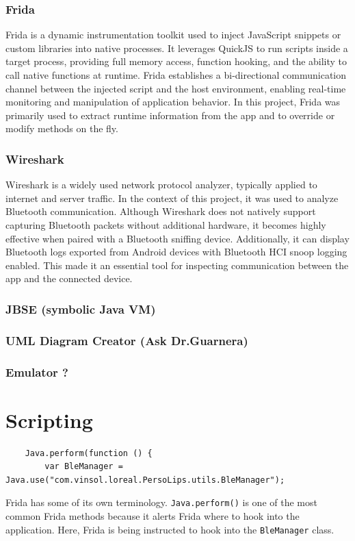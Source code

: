\subsubsection{Frida}
Frida is a dynamic instrumentation toolkit used to inject JavaScript snippets or custom libraries into native processes. It leverages QuickJS to run scripts inside a target process, providing full memory access, function hooking, and the ability to call native functions at runtime. Frida establishes a bi-directional communication channel between the injected script and the host environment, enabling real-time monitoring and manipulation of application behavior. In this project, Frida was primarily used to extract runtime information from the app and to override or modify methods on the fly.

\subsubsection{Wireshark}
Wireshark is a widely used network protocol analyzer, typically applied to internet and server traffic. In the context of this project, it was used to analyze Bluetooth communication. Although Wireshark does not natively support capturing Bluetooth packets without additional hardware, it becomes highly effective when paired with a Bluetooth sniffing device. Additionally, it can display Bluetooth logs exported from Android devices with Bluetooth HCI snoop logging enabled. This made it an essential tool for inspecting communication between the app and the connected device.

\subsubsection{JBSE (symbolic Java VM)}
\subsubsection{UML Diagram Creator (Ask Dr.Guarnera)}
\subsubsection{Emulator ?}

\section{Scripting}
\begin{lstlisting}
	Java.perform(function () {
		var BleManager = Java.use("com.vinsol.loreal.PersoLips.utils.BleManager");
	\end{lstlisting}
	Frida has some of its own terminology. \texttt{Java.perform()} is one of the most common Frida methods because it alerts Frida where to hook into the application. Here, Frida is being instructed to hook into the \texttt{BleManager} class.
	
